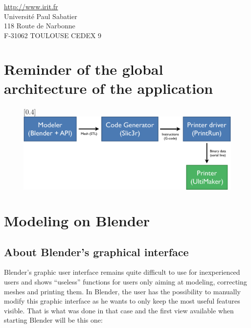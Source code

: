 \documentclass{article}
\begin{document}
\begin{center}
\url{http://www.irit.fr}\\
Université Paul Sabatier \\
118 Route de Narbonne \\
F-31062 TOULOUSE CEDEX 9
\end{center}

\thispagestyle{empty}

\newpage

\tableofcontents

\newpage

\section{Reminder of the global architecture of the application}


\begin{figure}[!h]
\begin{center}
\scalebox{0.4}[0.4]{\includegraphics{./Images/schema}}
\end{center}
\end{figure}

\newpage

\section{Modeling on Blender}

\subsection{About Blender’s graphical interface}

Blender's graphic user interface remains quite difficult to use for inexperienced users and shows ``useless'' functions for users only aiming at modeling, correcting meshes and printing them. In Blender, the user has the possibility to manually modify this graphic interface as he wants to only keep the most useful features visible. That is what was done in that case and the first view available when starting Blender will be this one: 
\bigskip
\bigskip
\end{document}
